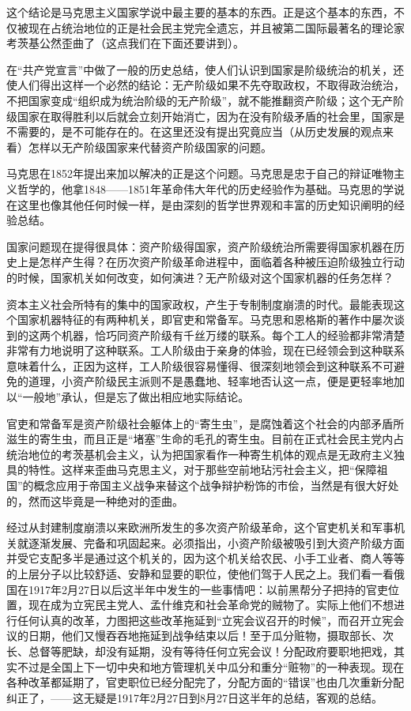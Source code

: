这个结论是马克思主义国家学说中最主要的基本的东西。正是这个基本的东西，不仅被现在占统治地位的正是社会民主党完全{\kaishu 遗忘}，并且被第二国际最著名的理论家考茨基公然{\kaishu 歪曲}了（这点我们在下面还要讲到）。

在“共产党宣言”中做了一般的历史总结，使人们认识到国家是阶级统治的机关，还使人们得出这样一个必然的结论：{\heiti 无产阶级如果不先夺取政权，不取得政治统治，不把国家变成“组织成为统治阶级的无产阶级”，就不能推翻资产阶级}；这个无产阶级国家在取得胜利以后就会立刻开始消亡，因为在没有阶级矛盾的社会里，国家是不需要的，是不可能存在的。在这里还没有提出究竟应当（从历史发展的观点来看）怎样以无产阶级国家来代替资产阶级国家的问题。

马克思在1852年提出来加以解决的正是这个问题。马克思是忠于自己的辩证唯物主义哲学的，他拿1848——1851年革命伟大年代的历史经验作为基础。马克思的学说在这里也像其他任何时候一样，是由深刻的哲学世界观和丰富的历史知识阐明的{\kaishu 经验总结}。

国家问题现在提得很具体：资产阶级得国家，资产阶级统治所需要得国家机器在历史上是怎样产生得？在历次资产阶级革命进程中，面临着各种被压迫阶级独立行动的时候，国家机关如何改变，如何演进？无产阶级对这个国家机器的任务怎样？

资本主义社会所特有的集中的国家政权，产生于专制制度崩溃的时代。最能表现这个国家机器特征的有两种机关，即官吏和常备军。马克思和恩格斯的著作中屡次谈到的这两个机器，恰巧同资产阶级有千丝万缕的联系。每个工人的经验都非常清楚非常有力地说明了这种联系。工人阶级由于亲身的体验，现在已经领会到这种联系意味着什么，正因为这样，工人阶级很容易懂得、很深刻地领会到这种联系不可避免的道理，小资产阶级民主派则不是愚蠢地、轻率地否认这一点，便是更轻率地加以“一般地”承认，但是忘了做出相应地实际结论。

官吏和常备军是资产阶级社会躯体上的“寄生虫”，是腐蚀着这个社会的内部矛盾所滋生的寄生虫，而且正是“堵塞”生命的毛孔的寄生虫。目前在正式社会民主党内占统治地位的考茨基机会主义，认为把国家看作一种{\kaishu 寄生机体}的观点是无政府主义独具的特性。这样来歪曲马克思主义，对于那些空前地玷污社会主义，把“保障祖国”的概念应用于帝国主义战争来替这个战争辩护粉饰的市侩，当然是有很大好处的，然而这毕竟是一种绝对的歪曲。

经过从封建制度崩溃以来欧洲所发生的多次资产阶级革命，这个官吏机关和军事机关就逐渐发展、完备和巩固起来。必须指出，小资产阶级被吸引到大资产阶级方面并受它支配多半是通过这个机关的，因为这个机关给农民、小手工业者、商人等等的上层分子以比较舒适、安静和显要的职位，使他们驾于人民之上。我们看一看俄国在1917年2月27日以后这半年中发生的一些事情吧：以前黑帮分子把持的官吏位置，现在成为立宪民主党人、孟什维克和社会革命党的贼物了。实际上他们不想进行任何认真的改革，力图把这些改革拖延到“立宪会议召开的时候”，而召开立宪会议的日期，他们又慢吞吞地拖延到战争结束以后！至于瓜分赃物，摄取部长、次长、总督等肥缺，却没有延期，没有等待任何立宪会议！分配政府要职地把戏，其实不过是全国上下一切中央和地方管理机关中瓜分和重分“赃物”的一种表现。现在各种改革都延期了，官吏职位已经分配完了，分配方面的“错误”也由几次重新分配纠正了，——这无疑是1917年2月27日到8月27日这半年的总结，客观的总结。

